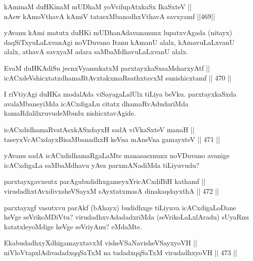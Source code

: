 \begin{shl}
kAminaM duHKinaM mUDhaM yoV\s vilupAtxkaSx IkaSxteV || \\
nAsw kAmoV\s thavA kAmiV tatasxMbanodhxV\s thavA savxyamf \hfill ||469||  
\end{shl}

\begin{artha}
yAvanu kAmi matutx duHKi mUDhanAdavananunx lupatxvAgada (nitayx)
daqSiTxyuLaLxvanAgi noVDuvano Itanu kAmanU alalx, kAmavuLaLxvanU
alalx, athavA savxyaM adara saMbaMdhavuLaLxvanU alalx.
\end{artha}

\begin{shl}
EvaM duHKAdiSu jecnxVyamukatxM parxtayxkaSxsaMsharxyAtf || \\
icACxdeVshicxtatxdhamaRtAvxtakxmaRsathxtavxM sunishicxtamf \hfill || 470 ||  
\end{shl}

\begin{artha}
I riVtiyAgi duHKa modalAda viSayagaLalUlx tiLiya beVku. parxtayxkaSxda
avalaMbaneyiMda icACxdigaLu citatx dhamaRvAdudariMda
kamaRdalilxruvudeMbudu nishicxtavAgide.
\end{artha}

\begin{shl}
icACxdidhamaRvatAsxkASxdayxH sadA viVkaSxteV manaH || \\
taseyxVcACxdayxBisaMbanadhxH keVna mAneVna gamayxteV \hfill || 471 ||  
\end{shl}

\begin{artha}
yAvanu sadA icACxdidhamaRgaLaMte manasasxnunx noVDuvano avanige
icACxdigaLa saMbaMdhavu yAva parxmANadiMda tiLiyuvudu?
\end{artha}

\begin{shl}
parxtayxgavxsutx parAgubxdidhxgameyxYricACxdiBiH kathamf || \\
virudadhxtAvxdivxsheVSayxM sAyxtatxmasA dinakaqdayxthA \hfill || 472 ||  
\end{shl}

\begin{artha}
parxtayxgf vasutxvu parAkf (bAhayx) budidhxge tiLiyuva icACxdigaLoDane
heVge seVrikoMDiVtu? virudadhxvAdadadxriMda (seVrikoLaLxlAradu)
sUyaRnu katatxleyoMdige heVge seVriyAnu? eMdaMte.
\end{artha}

\begin{shl}
EkabudadhxyXdhigamayxtavxM visheVSaNavisheVSayxyoVH || \\
niVloVtapxlAdivadadxqqSaTxM na tadadxqqSaTxM virudadhxyoVH \hfill || 473 ||  
\end{shl}

